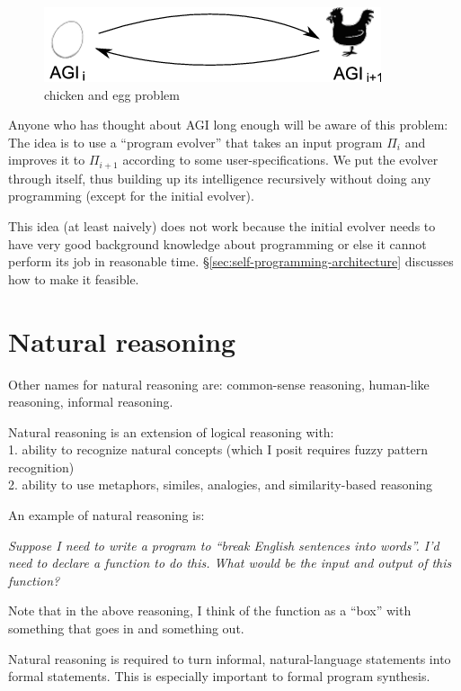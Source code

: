 \begin{figure}[H]
\centering
\includegraphics{chicken-and-egg1.png}
\caption{chicken and egg problem}
\end{figure}
\vspace{-0.5cm}

Anyone who has thought about AGI long enough will be aware of this problem:  The idea is to use a ``program evolver'' that takes an input program $\Pi_i$ and improves it to $\Pi_{i+1}$ according to some user-specifications.  We put the evolver through itself, thus building up its intelligence recursively without doing any programming (except for the initial evolver).

This idea (at least naively) does not work because the initial evolver needs to have very good background knowledge about programming or else it cannot perform its job in reasonable time.  \S\ref{sec:self-programming-architecture} discusses how to make it feasible.

\section{Natural reasoning}
\label{sec:natural-reasoning}

Other names for natural reasoning are: common-sense reasoning, human-like reasoning, informal reasoning.

Natural reasoning is an extension of logical reasoning with:\\
1.  ability to recognize natural concepts (which I posit requires fuzzy pattern recognition)\\
2.  ability to use metaphors, similes, analogies, and similarity-based reasoning

An example of natural reasoning is:

\leftskip 1cm \textit{Suppose I need to write a program to ``break English sentences into words''.  I'd need to declare a function to do this.  What would be the input and output of this function?}

\leftskip 0cm Note that in the above reasoning, I think of the function as a ``box'' with something that goes in and something out.

Natural reasoning is required to turn informal, natural-language statements into formal statements.  This is especially important to formal program synthesis.
